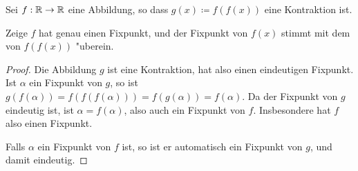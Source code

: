 \documentclass[a4paper,10pt]{article}
\begin{document}
%  
%  
% 
% 


\begin{Aufg}
 Sei $f: \mathbb{R} \to \mathbb{R}$ eine Abbildung, so dass $g(x) \coloneqq f(f(x))$ eine Kontraktion ist. 
 
 Zeige $f$ hat genau einen Fixpunkt, und der Fixpunkt von $f(x)$ stimmt mit dem von $f(f(x))$
 "uberein.
 
\end{Aufg}

\begin{proof}
 Die Abbildung $g$ ist eine Kontraktion, hat also einen eindeutigen Fixpunkt.
 Ist $\alpha$ ein Fixpunkt von $g$, so ist 
 $ g(f(\alpha)) = f(f(f(\alpha))) = f(g(\alpha))= f(\alpha).$ Da der Fixpunkt von $g$ eindeutig ist,
 ist $\alpha = f(\alpha)$, also auch ein Fixpunkt von $f$. Insbesondere hat $f$ also einen Fixpunkt.
 
 Falls $\alpha$ ein Fixpunkt von $f$ ist, so ist er automatisch ein Fixpunkt von $g$, und damit 
 eindeutig.
\end{proof}
\end{document}
